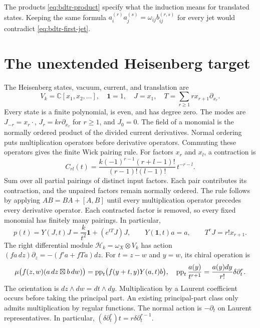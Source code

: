 The products \eqref{eq:bdtr-product} specify what the induction means for translated states.
Keeping the same formula $a_i^{(r)}a_j^{(s)}=\omega_{ij}b_{ij}^{(r,s)}$ for every jet would contradict \eqref{eq:bdtr-first-jet}.

\section{The unextended Heisenberg target}

The Heisenberg states, vacuum, current, and translation are
\[
 V_k=\mathbb C[x_1,x_2,\ldots],\quad
 \mathbf1=1,\quad J=x_1,\quad
 T=\sum_{r\geq1}r x_{r+1}\partial_{x_r}.
\]
Every state is a finite polynomial, is even, and has degree zero.
The modes are $J_{-r}=x_r\cdot$, $J_r=kr\partial_{x_r}$ for $r\geq1$, and $J_0=0$.
The field of a monomial is the normally ordered product of the divided current derivatives.
Normal ordering puts multiplication operators before derivative operators.
Commuting these operators gives the finite Wick pairing rule.
For factors $x_r$ and $x_l$, a contraction is
\[
 C_{rl}(t)=\frac{k(-1)^{r-1}(r+l-1)!}{(r-1)!(l-1)!}\,t^{-r-l}.
\]
Sum over all partial pairings of distinct input factors.
Each pair contributes its contraction, and the unpaired factors remain normally ordered.
The rule follows by applying $AB=BA+[A,B]$ until every multiplication operator precedes every derivative operator.
Each contracted factor is removed, so every fixed monomial has finitely many pairings.
In particular,
\begin{equation}\label{eq:bdtr-Heisenberg}
 p(t)=Y(J,t)J=\frac{k}{t^2}\mathbf1+(e^{tT}J)J,
 \qquad Y(\mathbf1,t)a=a,
 \qquad T^rJ=r!x_{r+1}.
\end{equation}
The right differential module $\mathcal H_k=\omega_X\otimes V_k$ has action
$(fa\,dz)\partial_z=-(f'a+fTa)dz$.
For $t=z-w$ and $y=w$, its chiral operation is
\begin{equation}\label{eq:bdtr-principal-part}
 \mu\bigl(f(z,w)(a\,dz\boxtimes b\,dw)\bigr)
 =\operatorname{pp}_t\bigl(f(y+t,y)Y(a,t)b\bigr),
 \quad
 \operatorname{pp}_t\frac{a(y)}{t^{r+1}}
 =\frac{a(y)dy}{r!}\delta\partial_t^r.
\end{equation}
The orientation is $dz\wedge dw=dt\wedge dy$.
Multiplication by a Laurent coefficient occurs before taking the principal part.
An existing principal-part class only admits multiplication by regular functions.
The normal action is $-\partial_t$ on Laurent representatives.
In particular, $(\delta\partial_t^r)t=r\delta\partial_t^{r-1}$.

